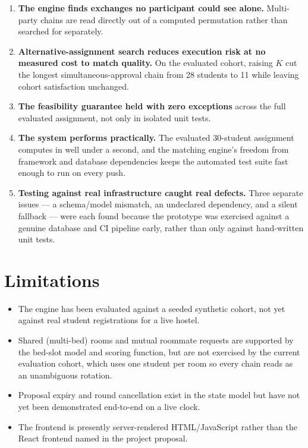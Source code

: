 \documentclass[11pt,a4paper]{report}
\begin{document}
\begin{enumerate}

    \item \textbf{The engine finds exchanges no participant could see
    alone.} Multi-party chains are read directly out of a computed
    permutation rather than searched for separately.

    \item \textbf{Alternative-assignment search reduces execution
    risk at no measured cost to match quality.} On the evaluated
    cohort, raising $K$ cut the longest simultaneous-approval chain
    from 28 students to 11 while leaving cohort satisfaction
    unchanged.

    \item \textbf{The feasibility guarantee held with zero
    exceptions} across the full evaluated assignment, not only in
    isolated unit tests.

    \item \textbf{The system performs practically.} The evaluated
    30-student assignment computes in well under a second, and the
    matching engine's freedom from framework and database dependencies
    keeps the automated test suite fast enough to run on every push.

    \item \textbf{Testing against real infrastructure caught real
    defects.} Three separate issues --- a schema/model mismatch, an
    undeclared dependency, and a silent fallback --- were each found
    because the prototype was exercised against a genuine database
    and CI pipeline early, rather than only against hand-written unit
    tests.

\end{enumerate}

\section{Limitations}

\begin{itemize}[leftmargin=0.7cm]

    \item The engine has been evaluated against a seeded synthetic
    cohort, not yet against real student registrations for a live
    hostel.

    \item Shared (multi-bed) rooms and mutual roommate requests are
    supported by the bed-slot model and scoring function, but are not
    exercised by the current evaluation cohort, which uses one student
    per room so every chain reads as an unambiguous rotation.

    \item Proposal expiry and round cancellation exist in the state
    model but have not yet been demonstrated end-to-end on a live
    clock.

    \item The frontend is presently server-rendered HTML/JavaScript
    rather than the React frontend named in the project proposal.

\end{itemize}
\end{document}
